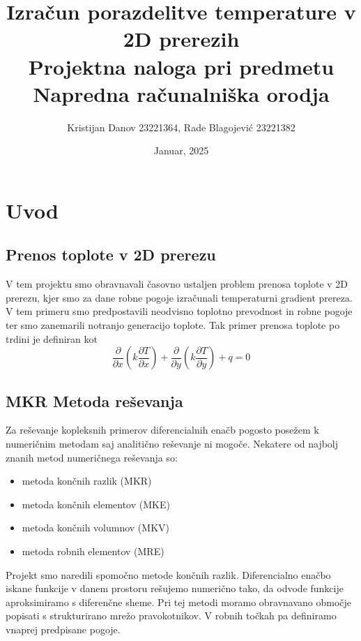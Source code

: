 \documentclass[12pt]{article}
\begin{document}
\title{\textbf{Izračun porazdelitve temperature v 2D prerezih} \\
\large Projektna naloga pri predmetu Napredna računalniška
orodja}
\author{Kristijan Danov 23221364, Rade Blagojević 23221382}
\date{Januar, 2025}
\maketitle
\thispagestyle{empty}

\newpage

\newpage

\renewcommand*\contentsname{Kazalo vsebine}
\tableofcontents
\renewcommand{\listfigurename}{Kazalo slik}
\listoffigures

\newpage

\section{Uvod}

\subsection{Prenos toplote v 2D prerezu}
V tem projektu smo obravnavali časovno ustaljen problem prenosa toplote v 2D prerezu, kjer smo za dane robne pogoje izračunali temperaturni gradient prereza. V tem primeru smo predpostavili neodvisno toplotno prevodnost in robne pogoje ter smo zanemarili notranjo generacijo toplote. Tak primer prenosa toplote po trdini je definiran kot
$$\frac{\partial}{\partial x}(k \frac{\partial T}{\partial x})+\frac{\partial}{\partial y}(k \frac{\partial T}{\partial y})+q=0$$

\subsection{MKR Metoda reševanja}
Za reševanje kopleksnih primerov diferencialnih enačb pogosto posežem k numeričnim metodam saj analitično reševanje ni mogoče. Nekatere od najbolj znanih metod numeričnega reševanja so:
\begin{itemize}
    \item metoda končnih razlik (MKR)
    \item metoda končnih elementov (MKE)
    \item metoda končnih volumnov (MKV)
    \item metoda robnih elementov (MRE)
\end{itemize}
Projekt smo naredili spomočno metode končnih razlik. Diferencialno enačbo iskane
funkcije v danem prostoru rešujemo numerično tako, da odvode funkcije aproksimiramo s diferenčne sheme.
\newline
Pri tej metodi moramo
obravnavano območje popisati s strukturirano mrežo pravokotnikov. V robnih točkah pa definiramo vnaprej predpisane pogoje.
\end{document}
